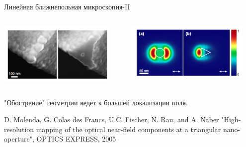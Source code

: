 \documentclass[9pt, compress, xcolor=table]{beamer}
\begin{document}
\begin{frame}{Линейная ближнепольная микроскопия-II}
\begin{columns}[c]
\column{6.5cm}
\begin{center}
\includegraphics[width=0.9\textwidth]{tr7}
\end{center}

\column{6.5cm}
\begin{center}
\includegraphics[width=0.9\textwidth]{tr6}
\end{center}

\end{columns}

"Обострение" геометрии ведет к большей локализации поля.

D. Molenda, G. Colas des Francs, U.C. Fischer, N. Rau, and A. Naber "High-resolution mapping of the optical near-field components at a triangular nano-aperture", OPTICS EXPRESS, 2005

\end{frame}
\end{document}
